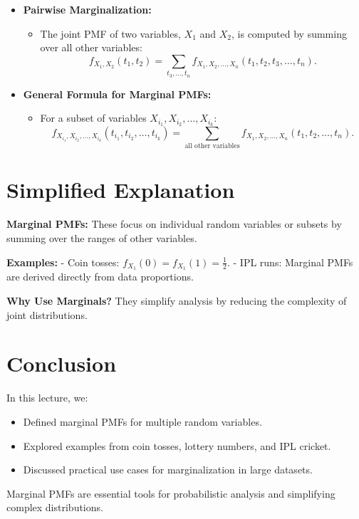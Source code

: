 \documentclass{article}
\begin{document}
\begin{itemize}
  \item \textbf{Pairwise Marginalization:}
    \begin{itemize}
      \item The joint PMF of two variables, $X_1$ and $X_2$, is computed by summing over all other variables:
        \[
          f_{X_1, X_2}(t_1, t_2) = \sum_{t_3, \dots, t_n} f_{X_1, X_2, \dots, X_n}(t_1, t_2, t_3, \dots, t_n).
        \]
    \end{itemize}

  \item \textbf{General Formula for Marginal PMFs:}
    \begin{itemize}
      \item For a subset of variables $X_{i_1}, X_{i_2}, \dots, X_{i_k}$:
        \[
          f_{X_{i_1}, X_{i_2}, \dots, X_{i_k}}(t_{i_1}, t_{i_2}, \dots, t_{i_k}) = \sum_{\text{all other variables}} f_{X_1, X_2, \dots, X_n}(t_1, t_2, \dots, t_n).
        \]
    \end{itemize}
\end{itemize}

\section*{Simplified Explanation}

\textbf{Marginal PMFs:}
These focus on individual random variables or subsets by summing over the ranges of other variables.

\textbf{Examples:}
- Coin tosses: $f_{X_1}(0) = f_{X_1}(1) = \frac{1}{2}$.
- IPL runs: Marginal PMFs are derived directly from data proportions.

\textbf{Why Use Marginals?}
They simplify analysis by reducing the complexity of joint distributions.

\section*{Conclusion}

In this lecture, we:
\begin{itemize}
  \item Defined marginal PMFs for multiple random variables.
  \item Explored examples from coin tosses, lottery numbers, and IPL cricket.
  \item Discussed practical use cases for marginalization in large datasets.
\end{itemize}

Marginal PMFs are essential tools for probabilistic analysis and simplifying complex distributions.
\end{document}

